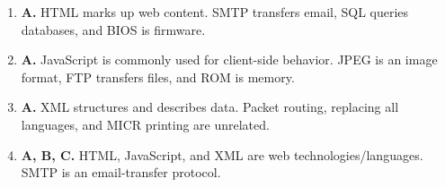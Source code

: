 \begin{enumerate}[label=\textbf{Q\arabic*.}, leftmargin=*]
\item \textbf{A.} HTML marks up web content. SMTP transfers email, SQL queries databases, and BIOS is firmware.

\item \textbf{A.} JavaScript is commonly used for client-side behavior. JPEG is an image format, FTP transfers files, and ROM is memory.

\item \textbf{A.} XML structures and describes data. Packet routing, replacing all languages, and MICR printing are unrelated.

\item \textbf{A, B, C.} HTML, JavaScript, and XML are web technologies/languages. SMTP is an email-transfer protocol.

\end{enumerate}
